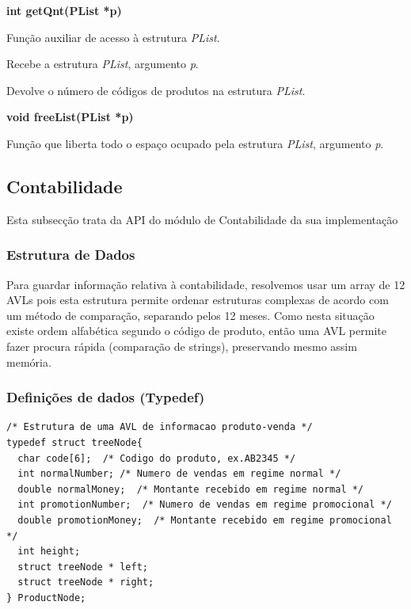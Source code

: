 \documentclass[10pt] {article}
\begin{document}
\noindent \textbf{int getQnt(PList *p)}
\par Função auxiliar de acesso à estrutura \emph{PList}.
\par Recebe a estrutura \emph{PList}, argumento \emph{p}.
\par Devolve o número de códigos de produtos na estrutura \emph{PList}.

\noindent \textbf{void freeList(PList *p)}
\par Função que liberta todo o espaço ocupado pela estrutura \emph{PList}, argumento \emph{p}.



\newpage
\subsection{Contabilidade}
\par Esta subsecção trata da API do módulo de Contabilidade da sua implementação

\subsubsection{Estrutura de Dados}
\par
Para guardar informação relativa à contabilidade, resolvemos usar um array de 12 AVLs pois esta estrutura permite ordenar estruturas complexas de acordo com um método de comparação, separando pelos 12 meses. Como nesta situação existe ordem alfabética segundo o código de produto, então uma AVL permite fazer procura rápida (comparação de strings), preservando mesmo assim memória.

\subsubsection{Definições de dados (Typedef)}

\begin{lstlisting}
/* Estrutura de uma AVL de informacao produto-venda */
typedef struct treeNode{
  char code[6];  /* Codigo do produto, ex.AB2345 */
  int normalNumber; /* Numero de vendas em regime normal */
  double normalMoney;  /* Montante recebido em regime normal */
  int promotionNumber;  /* Numero de vendas em regime promocional */
  double promotionMoney;  /* Montante recebido em regime promocional */
  int height;
  struct treeNode * left; 
  struct treeNode * right;
} ProductNode;
\end{lstlisting}
\end{document}
